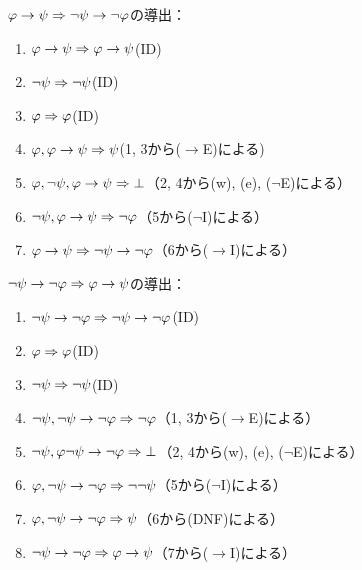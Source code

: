 \(\varphi \to \psi \Rightarrow \lnot \psi \to \lnot \varphi\)の導出：
\begin{enumerate}
	\item \(\varphi \to \psi \Rightarrow \varphi \to \psi\)\quad (ID)
	\item \(\lnot \psi \Rightarrow \lnot \psi\)\quad (ID)
	\item \(\varphi \Rightarrow \varphi\)\quad (ID)
	\item \(\varphi, \varphi \to \psi \Rightarrow \psi\)\quad (1, 3から(\(\to\)E)による)
	\item \(\varphi, \lnot \psi, \varphi \to \psi \Rightarrow \bot\)\quad （2, 4から(w), (e), (\(\lnot\)E)による）
	\item \(\lnot \psi, \varphi \to \psi \Rightarrow \lnot \varphi\)\quad （5から(\(\lnot\)I)による）
	\item \(\varphi \to \psi \Rightarrow \lnot \psi \to \lnot \varphi\)\quad （6から(\(\to\)I)による）
\end{enumerate}

\(\lnot \psi \to \lnot \varphi \Rightarrow \varphi \to \psi\)の導出：
\begin{enumerate}
	\item \(\lnot \psi \to \lnot \varphi \Rightarrow \lnot \psi \to \lnot \varphi\)\quad (ID)
	\item \(\varphi \Rightarrow \varphi\)\quad (ID)
	\item \(\lnot \psi \Rightarrow \lnot \psi\)\quad (ID)
	\item \(\lnot \psi, \lnot \psi \to \lnot \varphi \Rightarrow \lnot \varphi\)\quad （1, 3から(\(\to\)E)による）
	\item \(\lnot \psi, \varphi \lnot \psi \to \lnot \varphi \Rightarrow \bot\)\quad （2, 4から(w), (e), (\(\lnot\)E)による）
	\item \(\varphi, \lnot \psi \to \lnot\varphi \Rightarrow \lnot \lnot \psi\)\quad （5から(\(\lnot\)I)による）
	\item \(\varphi, \lnot \psi \to \lnot \varphi \Rightarrow \psi\)\quad （6から(DNF)による）
	\item \(\lnot \psi \to \lnot \varphi \Rightarrow \varphi \to \psi\)\quad （7から(\(\to\)I)による）
\end{enumerate}

